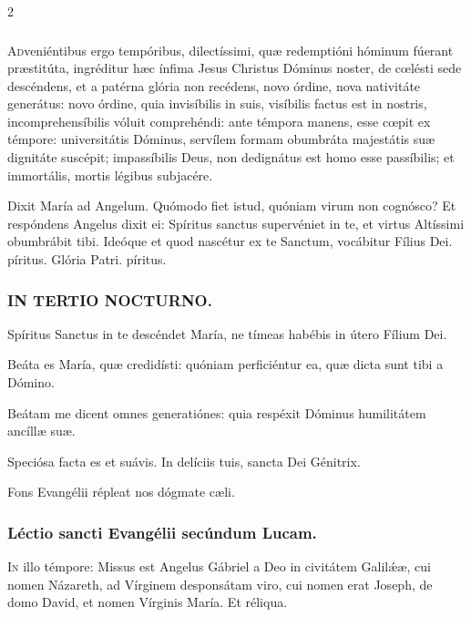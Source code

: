 \documentclass[9pt,twoside]{extarticle}
\begin{document}
\begin{multicols}{2}
\subsubsection*{\center {}}
\lettrine{A}dveniéntibus ergo tempóribus, dilectíssimi, quæ redemptióni hóminum fúerant præstitúta, ingréditur hæc ínfima Jesus Christus Dóminus noster, de cœlésti sede descéndens, et a patérna glória non recédens, novo órdine, nova nativitáte generátus: novo órdine, quia invisíbilis in suis, visíbilis factus est in nostris, incomprehensíbilis vóluit comprehéndi: ante témpora manens, esse cœpit ex témpore: universitátis Dóminus, servílem formam obumbráta majestátis suæ dignitáte suscépit; impassíbilis Deus, non dedignátus est homo esse passíbilis; et immortális, mortis légibus subjacére.

\begin{tightlist}{}
\item {} Dixit María ad Angelum. Quómodo fiet istud, quóniam virum non cognósco? Et respóndens Angelus dixit ei: \textred{*} Spíritus sanctus supervéniet in te, et virtus Altíssimi obumbrábit tibi.  Ideóque et quod nascétur ex te Sanctum, vocábitur Fílius Dei. píritus. Glória Patri. píritus.
\end{tightlist}

\subsubsection*{\center \textsc{IN TERTIO NOCTURNO.}}
\begin{tightlist}{}
\item {} Spíritus Sanctus in te descéndet María, ne tímeas habébis in útero Fílium Dei.
\item {} Beáta es María, quæ credidísti: quóniam perficiéntur ea, quæ dicta sunt tibi a Dómino.
\item {} Beátam me dicent omnes generatiónes: quia respéxit Dóminus humilitátem ancíllæ suæ.
\item {} Speciósa facta es et suávis.  In delíciis tuis, sancta Dei Génitrix.
\item {\small {} Fons Evangélii répleat nos dógmate cæli.}
\end{tightlist}

\subsubsection*{\center Léctio sancti Evangélii secúndum Lucam.}
\begin{center}\end{center}
\lettrine{I}n illo témpore: Missus est Angelus Gábriel a Deo in civitátem Galilǽæ, cui nomen Názareth, ad Vírginem desponsátam viro, cui nomen erat Joseph, de domo David, et nomen Vírginis María. Et réliqua.


\end{multicols}
\end{document}
